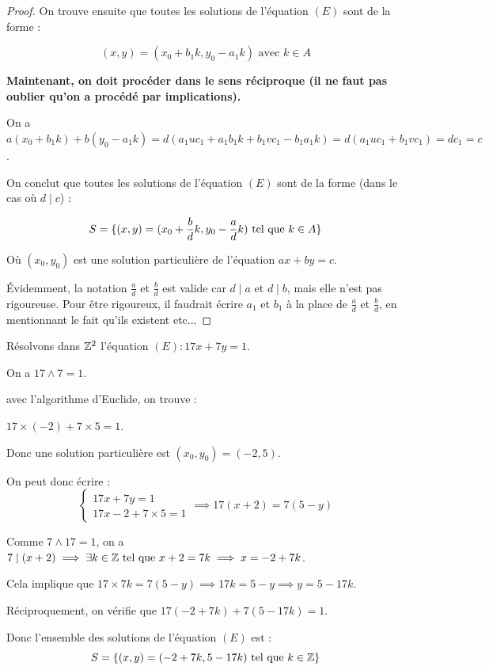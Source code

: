 \documentclass[12pt, a4paper]{report}
\begin{document}
\begin{proof}
    On trouve ensuite que toutes les solutions de l'équation $(E)$ sont de la forme :

    $$(x,y) = (x_0 + b_1 k, y_0 - a_1 k) \text{ avec } k \in A$$

    \textbf{Maintenant, on doit procéder dans le sens réciproque (il ne faut pas oublier qu'on a procédé par implications).}

    On a $a(x_0 + b_1 k) + b(y_0 - a_1 k) = d(a_1 u c_1 + a_1 b_1 k + b_1 v c_1 - b_1 a_1 k) = d(a_1 u c_1 + b_1 v c_1) = d c_1 = c$.

    On conclut que toutes les solutions de l'équation $(E)$ sont de la forme (dans le cas où $d \mid c$) :

    $$S = \{(x,y) = (x_0 + \frac{b}{d}k, y_0 - \frac{a}{d}k) \text{ tel que } k \in A\}$$

    Où $(x_0,y_0)$ est une solution particulière de l'équation $ax + by = c$.

    Évidemment, la notation $\frac{a}{d}$ et $\frac{b}{d}$ est valide car $d \mid a$ et $d \mid b$, mais elle n'est pas rigoureuse. Pour être rigoureux, il faudrait écrire $a_1$ et $b_1$ à la place de $\frac{a}{d}$ et $\frac{b}{d}$, en mentionnant le fait qu'ils existent etc...

\end{proof}

\begin{example}
    Résolvons dans $\mathbb{Z}^2$ l'équation $(E) : 17x + 7y = 1$.

    On a $17 \wedge 7 = 1$.

    avec l'algorithme d'Euclide, on trouve :

    $17 \times (-2) + 7 \times 5 = 1$.

    Donc une solution particulière est $(x_0,y_0) = (-2,5)$.

    On peut donc écrire :
    $$\begin{cases}
        17x + 7y = 1\\
        17x - 2 +7\times 5 = 1
    \end{cases}\implies 17(x+2) = 7(5-y)$$

    Comme $7 \wedge 17 = 1$, on a $7 \mid (x+2) \implies \exists k \in \mathbb{Z} \text{ tel que } x + 2 = 7k \implies x = -2 + 7k$.

    Cela implique que $17 \times 7k = 7(5-y) \implies 17k = 5 - y \implies y = 5 - 17k$.

    Réciproquement, on vérifie que $17(-2 + 7k) + 7(5 - 17k) = 1$.

    Donc l'ensemble des solutions de l'équation $(E)$ est :
    $$S = \{(x,y) = (-2 + 7k, 5 - 17k) \text{ tel que } k \in \mathbb{Z}\}$$
\end{example}
\end{document}
